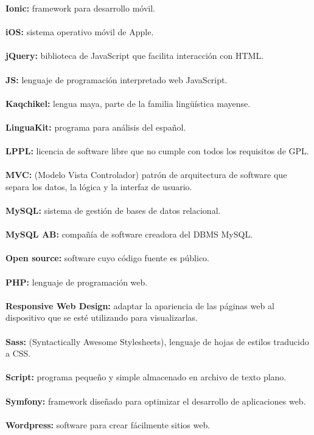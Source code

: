 \documentclass[a4paper,openright,11pt]{article}
\begin{document}
\textbf{Ionic:} framework para desarrollo móvil.\\ \\
\textbf{iOS:} sistema operativo móvil de Apple. \\\\
\textbf{jQuery:} biblioteca de JavaScript que facilita interacción con HTML.\\ \\
\textbf{JS:} lenguaje de programación interpretado web JavaScript.\\ \\
\textbf{Kaqchikel:} lengua maya, parte de la familia lingüística mayense. \\\\
\textbf{LinguaKit:} programa para análisis del español. \\ \\
\textbf{LPPL:} licencia de software libre que no cumple con todos los requisitos de GPL.\\ \\
\textbf{MVC:} (Modelo Vista Controlador) patrón de arquitectura de software que separa los datos, la lógica y la interfaz de usuario.\\\\
\textbf{MySQL:}  sistema de gestión de bases de datos relacional. \\\\
\textbf{MySQL AB:} compañía de software creadora del DBMS MySQL.\\ \\
\textbf{Open source:} software cuyo código fuente es público.\\ \\
\textbf{PHP:} lenguaje de programación web. \\ \\
\textbf{Responsive Web Design:} adaptar la apariencia de las páginas web al dispositivo que se esté utilizando para visualizarlas.  \\\\
\textbf{Sass:} (Syntactically Awesome Stylesheets), lenguaje de hojas de estilos traducido a CSS.\\ \\
\textbf{Script:} programa pequeño y simple almacenado en archivo de texto plano.\\ \\
\textbf{Symfony:} framework diseñado para optimizar el desarrollo de aplicaciones web.\\ \\
\textbf{Wordpress:} software para crear fácilmente sitios web.\\ \\
\newpage
\pagestyle{fancy}
\end{document}
